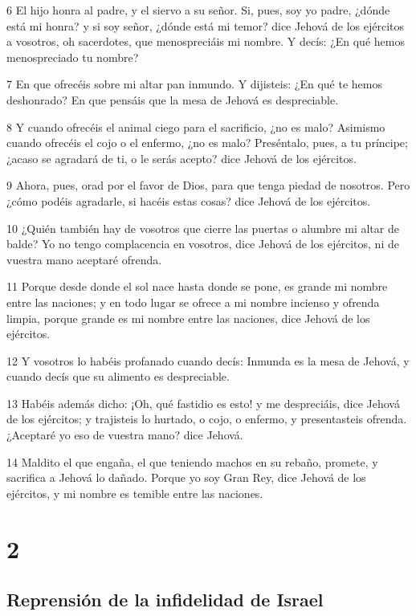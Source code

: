 \par 6 El hijo honra al padre, y el siervo a su señor. Si, pues, soy yo padre, ¿dónde está mi honra? y si soy señor, ¿dónde está mi temor? dice Jehová de los ejércitos a vosotros, oh sacerdotes, que menospreciáis mi nombre. Y decís: ¿En qué hemos menospreciado tu nombre?
\par 7 En que ofrecéis sobre mi altar pan inmundo. Y dijisteis: ¿En qué te hemos deshonrado? En que pensáis que la mesa de Jehová es despreciable.
\par 8 Y cuando ofrecéis el animal ciego para el sacrificio, ¿no es malo? Asimismo cuando ofrecéis el cojo o el enfermo, ¿no es malo? Preséntalo, pues, a tu príncipe; ¿acaso se agradará de ti, o le serás acepto? dice Jehová de los ejércitos.
\par 9 Ahora, pues, orad por el favor de Dios, para que tenga piedad de nosotros. Pero ¿cómo podéis agradarle, si hacéis estas cosas? dice Jehová de los ejércitos.
\par 10 ¿Quién también hay de vosotros que cierre las puertas o alumbre mi altar de balde? Yo no tengo complacencia en vosotros, dice Jehová de los ejércitos, ni de vuestra mano aceptaré ofrenda.
\par 11 Porque desde donde el sol nace hasta donde se pone, es grande mi nombre entre las naciones; y en todo lugar se ofrece a mi nombre incienso y ofrenda limpia, porque grande es mi nombre entre las naciones, dice Jehová de los ejércitos.
\par 12 Y vosotros lo habéis profanado cuando decís: Inmunda es la mesa de Jehová, y cuando decís que su alimento es despreciable.
\par 13 Habéis además dicho: ¡Oh, qué fastidio es esto! y me despreciáis, dice Jehová de los ejércitos; y trajisteis lo hurtado, o cojo, o enfermo, y presentasteis ofrenda. ¿Aceptaré yo eso de vuestra mano? dice Jehová.
\par 14 Maldito el que engaña, el que teniendo machos en su rebaño, promete, y sacrifica a Jehová lo dañado. Porque yo soy Gran Rey, dice Jehová de los ejércitos, y mi nombre es temible entre las naciones.

\chapter{2}

\section*{Reprensión de la infidelidad de Israel}

